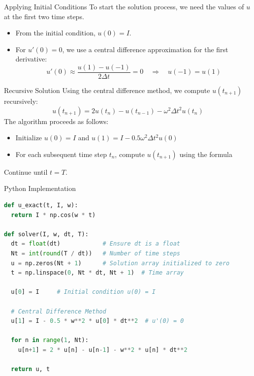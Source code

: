 \documentclass[10pt, aspectratio=54]{beamer}
\begin{document}
	\begin{frame}{Applying Initial Conditions}
		\justifying
		To start the solution process, we need the values of \( u \) at the first two time steps.
		\begin{itemize}
			\item From the initial condition, \( u(0) = I \).
			\item For \( u'(0) = 0 \), we use a central difference approximation for the first derivative:
			\[
			u'(0) \approx \frac{u(1) - u(-1)}{2\Delta t} = 0 \quad \Rightarrow \quad u(-1) = u(1) 
			\]

		\end{itemize}

	\end{frame}
	
	\begin{frame}{Recursive Solution}
		\justifying
		Using the central difference method, we compute \( u(t_{n+1}) \) recursively:
		\[
		u(t_{n+1}) = 2u(t_n) - u(t_{n-1}) - \omega^2 \Delta t^2 u(t_n)
		\]
		The algorithm proceeds as follows:
		\begin{itemize}
			\item Initialize \( u(0) = I \) and \( u(1) = I - 0.5  \omega^2 \Delta t^2 u(0)\)
			\item For each subsequent time step \( t_n \), compute \( u(t_{n+1}) \) using the formula
		\end{itemize}
		Continue until \( t = T \).
	\end{frame}
	
	\begin{frame}[fragile]{Python Implementation}
		
\begin{lstlisting}[language=Python]
def u_exact(t, I, w):
  return I * np.cos(w * t)

def solver(I, w, dt, T):
  dt = float(dt)            # Ensure dt is a float
  Nt = int(round(T / dt))   # Number of time steps
  u = np.zeros(Nt + 1)      # Solution array initialized to zero
  t = np.linspace(0, Nt * dt, Nt + 1)  # Time array
	
  u[0] = I     # Initial condition u(0) = I
	
  # Central Difference Method
  u[1] = I - 0.5 * w**2 * u[0] * dt**2  # u'(0) = 0
	
  for n in range(1, Nt):
    u[n+1] = 2 * u[n] - u[n-1] - w**2 * u[n] * dt**2
	
  return u, t
\end{lstlisting}	
	\end{frame}
	
\end{document}
